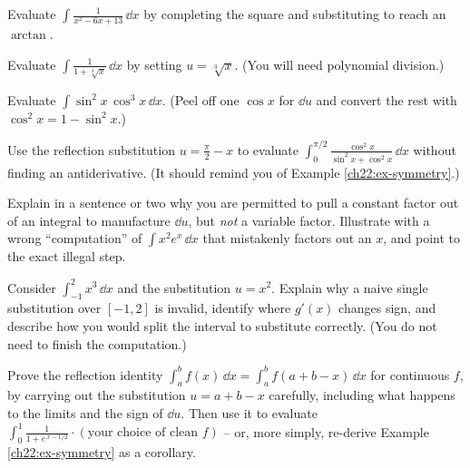 \begin{exercise}
Evaluate $\displaystyle \int \frac{1}{x^2 - 6x + 13}\,\dd x$ by completing the square
and substituting to reach an $\arctan$.
\end{exercise}

\begin{exercise}[Rationalize]
Evaluate $\displaystyle \int \frac{1}{1+\sqrt[3]{x}}\,\dd x$ by setting $u =
\sqrt[3]{x}$. (You will need polynomial division.)
\end{exercise}

\begin{exercise}
Evaluate $\displaystyle \int \sin^2 x\,\cos^3 x\,\dd x$. (Peel off one $\cos x$ for
$\dd u$ and convert the rest with $\cos^2 x = 1-\sin^2 x$.)
\end{exercise}

\begin{exercise}[Symmetry]
Use the reflection substitution $u = \tfrac{\pi}{2}-x$ to evaluate
$\displaystyle \int_0^{\pi/2} \frac{\cos^2 x}{\sin^2 x + \cos^2 x}\,\dd x$ without
finding an antiderivative. (It should remind you of Example \ref{ch22:ex-symmetry}.)
\end{exercise}

\begin{exercise}
Explain in a sentence or two why you are permitted to pull a constant factor out of
an integral to manufacture $\dd u$, but \emph{not} a variable factor. Illustrate
with a wrong ``computation'' of $\int x^2 e^{x}\,\dd x$ that mistakenly factors out
an $x$, and point to the exact illegal step.
\end{exercise}

\begin{exercise}
Consider $\displaystyle \int_{-1}^{2} x^3\,\dd x$ and the substitution $u = x^2$.
Explain why a naive single substitution over $[-1,2]$ is invalid, identify where
$g'(x)$ changes sign, and describe how you would split the interval to substitute
correctly. (You do not need to finish the computation.)
\end{exercise}

\begin{exercise}[Proof]
Prove the reflection identity $\displaystyle \int_a^b f(x)\,\dd x = \int_a^b
f(a+b-x)\,\dd x$ for continuous $f$, by carrying out the substitution $u = a+b-x$
carefully, including what happens to the limits and the sign of $\dd u$. Then use it
to evaluate $\int_0^1 \frac{1}{1 + e^{\,x - 1/2}}\cdot(\text{your choice of clean }
f)$ -- or, more simply, re-derive Example \ref{ch22:ex-symmetry} as a corollary.
\end{exercise}

